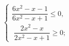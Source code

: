 \begin{ex}[type=ineq_system]
	\begin{condition}
		$\begin{cases} \dfrac{6x^2 - x - 1}{6x^2 - x + 1}\leqslant0 ,\\
			\; \dfrac{2x^2 - x}{2x^2 - x + 1}\geqslant0  ;
		\end{cases}$
	\end{condition}
\end{ex}